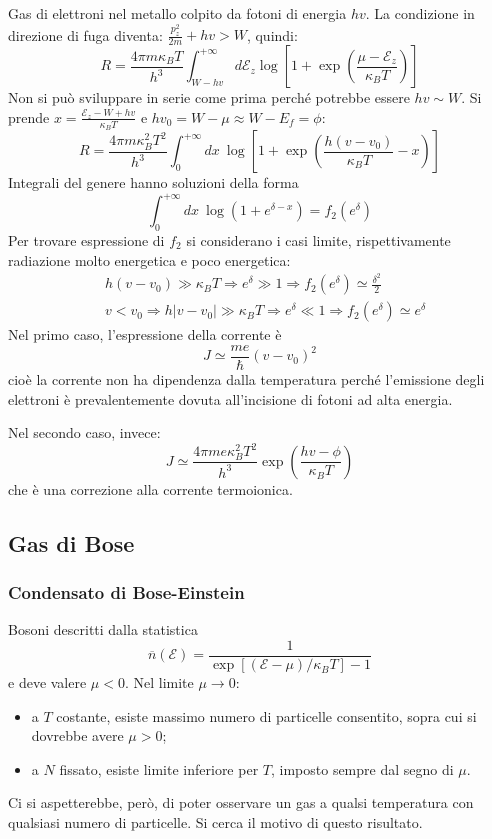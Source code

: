 \documentclass[10pt, a4paper]{scrartcl}
\numberwithin{equation}{subsection}
\theoremstyle{style1}
\theoremstyle{style2}
\begin{document}
Gas di elettroni nel metallo colpito da fotoni di energia $hv$. La condizione in direzione di fuga diventa: $\frac{p^2_z}{2m} + hv > W$, quindi:
\[
R = \frac{4 \pi m \kappa _B T}{h^3} \int_{W- hv} ^{+\infty}  d \mathscr{E}_z \log \left[ 1 + \exp \left(\frac{\mu - \mathscr{E}_z}{\kappa _B T}\right)  \right] 
\] 
Non si pu\`o sviluppare in serie come prima perch\'e potrebbe essere $hv \sim W$. Si prende $x = \frac{\mathscr{E}_z - W + hv}{\kappa _B T}$ e $hv_0 = W - \mu  \approx W - E_f = \phi $:
\[
R = \frac{4 \pi m \kappa _B^2 T^2}{h^3}  \int_{0} ^{+\infty} dx \ \log \left[ 1+ \exp \left(\frac{h(v-v_0)}{\kappa _B T} - x\right)  \right] 
\] 
Integrali del genere hanno soluzioni della forma
\[
\int_{0} ^{+\infty} dx \ \log \left(1 + e ^{ \delta  - x } \right) = f_2 (e^\delta )
\] 
Per trovare espressione di $f_2$ si considerano i casi limite, rispettivamente radiazione molto energetica e poco energetica:
\[
\begin{split}
	&h(v-v_0) \gg \kappa _B T \Rightarrow  e^\delta  \gg 1 \Rightarrow  f_2 (e^\delta ) \simeq \frac{\delta ^2}{2}\\
	& v< v_0 \Rightarrow  h|v-v_0| \gg \kappa _B T \Rightarrow e^\delta \ll 1 \Rightarrow  f_2 (e^\delta ) \simeq e^\delta 
\end{split}
\] 
Nel primo caso, l'espressione della corrente \`e 
\begin{equation}
	J \simeq \frac{me}{\hbar } (v-v_0)^2
\end{equation}
cio\`e la corrente non ha dipendenza dalla temperatura perch\'e l'emissione degli elettroni \`e prevalentemente dovuta all'incisione di fotoni ad alta energia.

Nel secondo caso, invece:
\begin{equation}
	J \simeq \frac{4 \pi m e \kappa _B^2 T^2}{h^3} \exp \left(\frac{hv - \phi }{\kappa _B T}\right) 
\end{equation}
che \`e una correzione alla corrente termoionica.
\subsection{Gas di Bose}
\subsubsection{Condensato di Bose-Einstein}
Bosoni descritti dalla statistica
\[
\overline{n} (\mathscr{E}) = \frac{1}{\exp\left[ (\mathscr{E}-\mu ) / \kappa _B T \right] - 1}
\] 
e deve valere $\mu  < 0$. Nel limite $\mu \to 0$:
\begin{itemize}
	\item a $T $ costante, esiste massimo numero di particelle consentito, sopra cui si dovrebbe avere $\mu >0$;
	\item a $N$ fissato, esiste limite inferiore per $T$, imposto sempre dal segno di $\mu $.
\end{itemize}
Ci si aspetterebbe, per\`o, di poter osservare un gas a qualsi temperatura con qualsiasi numero di particelle. 
Si cerca il motivo di questo risultato.
\end{document}
